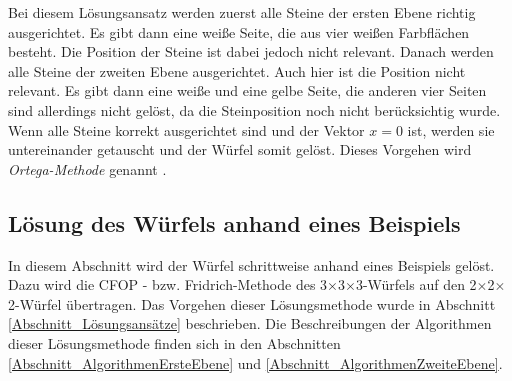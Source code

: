 \documentclass[12pt,a4paper, usenames, dvipsnames]{article}
\theoremstyle{mystyle}
\theoremstyle{definition}
\newcommand{\Ttwo}{2$\times$2$\times$2-}
\newcommand{\Tthree}{3$\times$3$\times$3-}
\begin{document}
Bei diesem Lösungsansatz werden zuerst alle Steine der ersten Ebene richtig ausgerichtet. Es gibt dann eine weiße Seite, die aus vier weißen Farbflächen besteht. Die Position der Steine ist dabei jedoch nicht relevant. Danach werden alle Steine der zweiten Ebene ausgerichtet. Auch hier ist die Position nicht relevant. Es gibt dann eine weiße und eine gelbe Seite, die anderen vier Seiten sind allerdings nicht gelöst, da die Steinposition noch nicht berücksichtig wurde.
Wenn alle Steine korrekt ausgerichtet sind und der Vektor $x=0$ ist, werden sie untereinander getauscht und der Würfel somit gelöst. Dieses Vorgehen wird \textit{Ortega-Methode} genannt \cite{RF2}.





%
%
%
%
%
%
%
%
%
%
%
%
%
%
%
%
%
%
%
%
\subsection{Lösung des Würfels anhand eines Beispiels}

\label{Abschnitt_LösungBeispiel}


In diesem Abschnitt wird der Würfel schrittweise anhand eines Beispiels gelöst. Dazu wird die CFOP - bzw. Fridrich-Methode des \Tthree Würfels auf den \Ttwo Würfel übertragen. Das Vorgehen dieser Lösungsmethode wurde in Abschnitt \ref{Abschnitt_Lösungsansätze} beschrieben. Die Beschreibungen der Algorithmen dieser Lösungsmethode finden sich in den Abschnitten \ref{Abschnitt_AlgorithmenErsteEbene} und \ref{Abschnitt_AlgorithmenZweiteEbene}.
\end{document}
